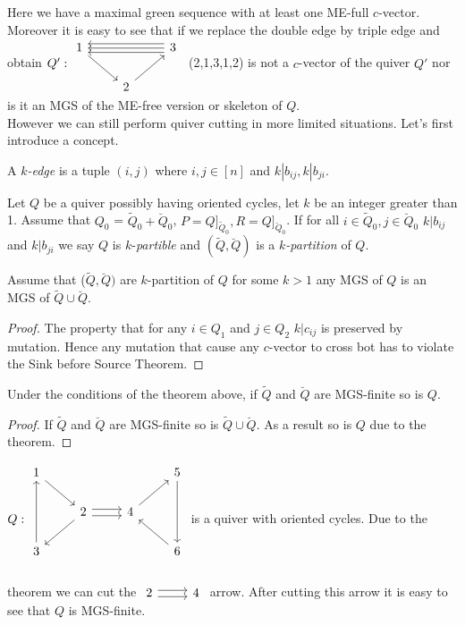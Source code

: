 \indent Here we have a maximal green sequence with at least one ME-full $c$-vector. Moreover it is easy to see that if we replace the double edge by triple edge and obtain $Q': \begin{tikzcd}
1\arrow[rd] &  & 3\lefttwicetriplearrow\\
 & 2\arrow[ur]
\end{tikzcd}$\ (2,1,3,1,2) is not a $c$-vector of the quiver $Q'$ nor is it an MGS of the ME-free version or skeleton of $Q$.\\
\indent However we can still perform quiver cutting in more limited situations. Let's first introduce a concept.
\begin{definition}
A $k$\textit{-edge} is a tuple $(i,j)$ where $i,j\in [n]$ and $k|b_{ij}, k|b_{ji}$.
\end{definition}
\begin{definition}
Let $Q$ be a quiver possibly having oriented cycles, let $k$ be an integer greater than 1. Assume that $Q_0$ = $\tilde{Q}_0 + \breve{Q}_0$, $P = Q]_{\tilde{Q}_0}, R = Q]_{\breve{Q}_0}$. If for all $i\in \tilde{Q}_0, j\in  \breve{Q}_0$ $k|b_{ij}$ and $k|b_{ji}$ we say $Q$ is $k$-\textit{partible} and $(\tilde{Q}, \breve{Q})$ is a $k$\textit{-partition} of $Q$.
\end{definition}
\begin{theorem}
Assume that ($\tilde{Q},\breve{Q})$ are $k$-partition of $Q$ for some $k>1$ any MGS of $Q$ is an MGS of $\tilde{Q}\cup\breve{Q}$.\label{C4T2B}
\end{theorem}
\begin{proof}
The property that for any $i\in Q_1$ and $j\in Q_2$ $k|c_{ij}$ is preserved by mutation. Hence any mutation that cause any $c$-vector to cross bot has to violate the Sink before Source Theorem.
\end{proof}
\begin{corollary}
Under the conditions of the theorem above, if $\tilde{Q}$ and $\breve{Q}$ are MGS-finite so is $Q$.
\end{corollary}
\begin{proof}
If $\tilde{Q}$ and $\breve{Q}$ are MGS-finite so is $\tilde{Q}\cup\breve{Q}$. As a result so is $Q$ due to the theorem.
\end{proof}
\begin{example}
$Q:\begin{tikzcd}
1\arrow[rd] &                                             &                   &5\arrow[dd]\\
                 &2\arrow[dl]\rightdoublearrow & 4\arrow[ur] &\\
3\arrow[uu] &                                            &                  &6\arrow[ul]\\
\end{tikzcd}$ is a quiver with oriented cycles. Due to the theorem we can cut the $\begin{tikzcd}2\rightdoublearrow & 4\end{tikzcd}$ arrow. After cutting this arrow it is easy to see that $Q$ is MGS-finite.
\end{example}
